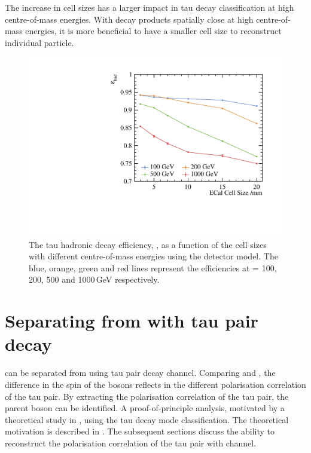 The increase in \ECAL cell sizes has a larger impact in tau decay classification at high centre-of-mass energies. With decay products spatially close at high centre-of-mass energies, it is more beneficial to have a smaller \ECAL cell size to reconstruct individual particle.

\begin{figure}[htbp]
\centering %
\includegraphics[width=.85\textwidth]{tau/plots3/hadronicEff.pdf}
\caption[The tau hadronic decay efficiency as a function of  the \ECAL cell sizes at different \sqrtS with the \ILD detector model.]
{The tau hadronic decay efficiency, \tauHad, as a function of  the \ECAL cell sizes with different centre-of-mass energies using the \ILD detector model. The blue, orange, green and red lines  represent the efficiencies at \sqrtS = 100, 200, 500 and 1000\,GeV respectively.}
\label{fig:TauHadronicEfficiency}
\end{figure}


\section{Separating \PHiggs from \PZ with tau pair decay}
\label{sec:tauHZ}
\PHiggs can be separated from  \PZ using  tau pair decay channel. Comparing \HiggsToTauTau  and \ZToTauTau, the difference in the spin of the bosons reflects in the different polarisation correlation of the tau pair. By extracting the polarisation correlation of the tau pair, the parent boson can be identified. A proof-of-principle analysis, motivated by a theoretical study in \cite{Bullock:1991my}, using the tau decay mode classification. The theoretical motivation is described in . The subsequent sections discuss the ability to reconstruct the polarisation correlation of the tau pair with \ZToTauTau channel.

